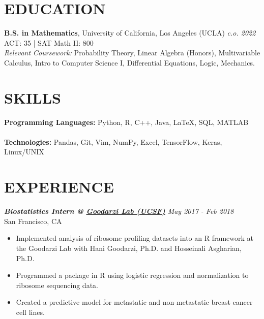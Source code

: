 \documentclass[margin, 10pt]{res} %
\begin{document}
\begin{resume}


\section{\large EDUCATION}

{\bf B.S. in Mathematics}, University of California, Los Angeles (UCLA) \hfill{\sl c.o. 2022}\\
ACT: 35 | SAT Math II: 800\\
{\sl Relevant Coursework:} Probability Theory, Linear Algebra (Honors), Multivariable Calculus, Intro to Computer Science I, Differential Equations, Logic, Mechanics.

\section{\large SKILLS} 

{\bf Programming Languages:} 
Python, R, C++, Java, {\LaTeX}, SQL, MATLAB \\ \\
{\bf Technologies:}
Pandas, Git, Vim, NumPy, Excel, TensorFlow, Keras, Linux/UNIX
 
\section{\large EXPERIENCE}

{\sl {\bf Biostatistics Intern @ \href {https://goodarzilab.ucsf.edu/}{Goodarzi Lab (UCSF)}} \hfill May 2017 - Feb 2018} \\
San Francisco, CA

\begin{itemize} \itemsep -1pt %
\item Implemented analysis of ribosome profiling datasets into an R framework at the Goodarzi Lab with Hani Goodarzi, Ph.D. and Hosseinali Asgharian, Ph.D.
\item Programmed a package in R using logistic regression and normalization to ribosome sequencing data.
\item Created a predictive model for metastatic and non-metastatic breast cancer cell lines.
\end{itemize}
 

\end{resume}
\end{document}

